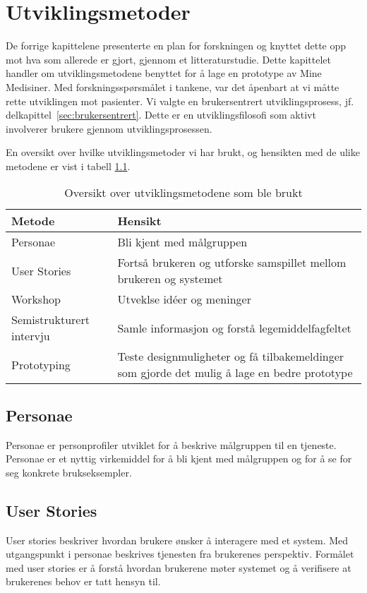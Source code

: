 \chapter{Utviklingsmetoder} \label{chap:utviklingsmetoder}

De forrige kapittelene presenterte en plan for forskningen og knyttet dette opp mot hva som allerede er gjort, gjennom et litteraturstudie. Dette kapittelet handler om utviklingsmetodene benyttet for å lage en prototype av Mine Medisiner. Med forskningsspørsmålet i tankene, var det åpenbart at vi måtte rette utviklingen mot pasienter. Vi valgte en brukersentrert utviklingsprosess, jf. delkapittel~\ref{sec:brukersentrert}. Dette er en utviklingsfilosofi som aktivt involverer brukere gjennom utviklingsprosessen. 

En oversikt over hvilke utviklingsmetoder vi har brukt, og hensikten med de ulike metodene er vist i tabell \ref{tab:utviklingsmetodene}.

\begin{table}[H]
    \centering
    \begin{tabular}{ | l | p{7cm} | }
      \hline
      \textbf{Metode} & \textbf{Hensikt} \\ \hline
      Personae & Bli kjent med målgruppen \\ \hline
      User Stories & Fortså brukeren og utforske samspillet mellom brukeren og systemet \\ \hline
      Workshop & Utveklse idéer og meninger \\ \hline
      Semistrukturert intervju & Samle informasjon og forstå legemiddelfagfeltet \\ \hline
      Prototyping & Teste designmuligheter og få tilbakemeldinger som gjorde det mulig å lage en bedre prototype \\ 
      \hline
    \end{tabular}
    \caption{Oversikt over utviklingsmetodene som ble brukt}
    \label{tab:utviklingsmetodene}
\end{table}


\section{Personae}
Personae er personprofiler utviklet for å beskrive målgruppen til en tjeneste. Personae er et nyttig virkemiddel for å bli kjent med målgruppen og for å se for seg konkrete brukseksempler. 
\section{User Stories}
User stories beskriver hvordan brukere ønsker å interagere med et system. Med utgangspunkt i personae beskrives tjenesten fra brukerenes perspektiv. Formålet med user stories er å forstå hvordan brukerene møter systemet og å verifisere at brukerenes behov er tatt hensyn til.

